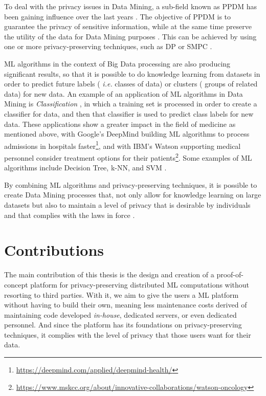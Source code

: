 To deal with the privacy issues in Data Mining, a sub-field known as \ac{PPDM} has been gaining influence over the last years \cite{DAcquisto2015}. The objective of PPDM is to guarantee the privacy of sensitive information, while at the same time preserve the utility of the data for Data Mining purposes \cite{agrawal2000privacy}.
This can be achieved by using one or more privacy-preserving techniques, such as \ac{DP} \cite{Danezis2015} or \ac{SMPC} \cite{DAcquisto2015}.


\ac{ML} algorithms in the context of Big Data processing are also producing significant results, so that it is possible to do knowledge learning from datasets in order to predict future labels ( \textit{i.e.} classes of data) or clusters ( groups of related data) for new data. An example of an application of \ac{ML} algorithms in Data Mining is \textit{Classification} \cite{LeiXu2014}, in which a training set is processed in order to create a classifier for data, and then that classifier is used to predict class labels for new data. These applications show a greater impact in the field of medicine as mentioned above, with Google's DeepMind building \ac{ML} algorithms to process admissions in hospitals faster\footnote{\url{https://deepmind.com/applied/deepmind-health/}}, and with IBM's Watson supporting medical personnel consider treatment options for their patients\footnote{\url{https://www.mskcc.org/about/innovative-collaborations/watson-oncology}}.
Some examples of \ac{ML} algorithms include Decision Tree, \ac{k-NN}, and \ac{SVM} \cite{LeiXu2014}.

By combining \ac{ML} algorithms and privacy-preserving techniques, it is possible to create Data Mining processes that, not only allow for knowledge learning on large datasets but also to maintain a level of privacy that is desirable by individuals and that complies with the laws in force \cite{DAcquisto2015}.



\section{Contributions}
\label{sec:Intro_Contributions}

The main contribution of this thesis is the design and creation of a proof-of-concept platform for privacy-preserving distributed \ac{ML} computations without resorting to third parties. With it, we aim to give the users a \ac{ML} platform without having to build their own, meaning less maintenance costs derived of maintaining code developed \textit{in-house}, dedicated servers, or even dedicated personnel. And since the platform has its foundations on privacy-preserving techniques, it complies with the level of privacy that those users want for their data.

